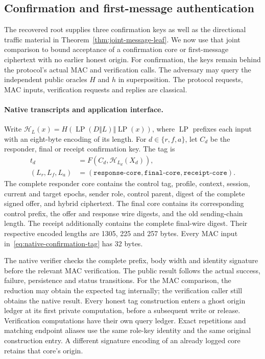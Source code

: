 \subsection{Confirmation and first-message authentication}
\label{sec:confirmation-traffic}

The recovered root supplies three confirmation keys as well as the
directional traffic material in Theorem~\ref{thm:joint-message-leaf}.
We now use that joint comparison to bound acceptance of a confirmation
core or first-message ciphertext with no earlier honest origin. For
confirmation, the keys remain behind the protocol's actual MAC and
verification calls.
The adversary may query the independent public oracles $H$ and $h$ in
superposition. The protocol requests, MAC inputs, verification requests
and replies are classical.

\paragraph{Native transcripts and application interface.}
Write $\mathcal H_L(x)=H(\operatorname{LP}(D\Vert L)
\Vert\operatorname{LP}(x))$, where $\operatorname{LP}$ prefixes each input
with an eight-byte encoding of its length. For $d\in\{r,f,a\}$, let $C_d$ be the responder,
final or receipt confirmation key. The tag is
\begin{equation}
\begin{aligned}
 t_d&=F(C_d,\mathcal H_{L_d}(X_d)),\\
 (L_r,L_f,L_a)&=(\texttt{response-core},\texttt{final-core},
                         \texttt{receipt-core}).
\end{aligned}
\label{eq:native-confirmation-tag}
\end{equation}
The complete responder core contains the control tag, profile, context,
session, current and target epochs, sender role, control parent, digest of
the complete signed offer, and hybrid ciphertext. The final core contains
its corresponding control prefix, the offer and response wire digests,
and the old sending-chain length. The receipt additionally contains the
complete final-wire digest. Their respective encoded lengths are 1305,
225 and 257 bytes. Every MAC input in~\eqref{eq:native-confirmation-tag}
has 32 bytes.

The native verifier checks the complete prefix, body width and identity
signature before the relevant MAC verification. The public result follows
the actual success, failure, persistence and status transitions. For the MAC
comparison, the reduction may obtain the expected tag internally;
the verification caller still obtains the native result. Every honest tag
construction enters a ghost origin ledger at its first private
computation, before a subsequent write or release. Verification
computations have their own query ledger. Exact repetitions and matching
endpoint aliases use the same role-key identity and the same original
construction entry. A different signature encoding of an already logged
core retains that core's origin.

